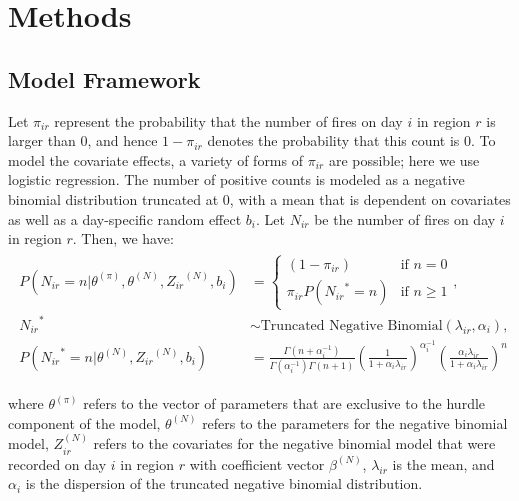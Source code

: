 \documentclass[10pt,letterpaper]{article}
\begin{document}
\hypertarget{methods}{%
\section{Methods}\label{methods}}

\hypertarget{model-framework}{%
\subsection{Model Framework}\label{model-framework}}

Let \(\pi_{ir}\) represent the probability that the number of fires on
day \(i\) in region \(r\) is larger than 0, and hence \(1-\pi_{ir}\)
denotes the probability that this count is 0. To model the covariate effects, a
variety of forms of \(\pi_{ir}\) are possible; here we use logistic
regression. The number of positive counts is modeled as a negative
binomial distribution truncated at 0, with a mean that is dependent on
covariates as well as a day-specific random effect \(b_i\). Let \(N_{ir}\) be the
number of fires on day \(i\) in region \(r\). Then, we have:
\begin{align}
\begin{split}
P(N_{ir} = n|\theta^{(\pi)}, \theta^{(N)}, {Z_{ir}}^{(N)}, b_i) &= \begin{cases}
(1-\pi_{ir}) &\text{if }n=0\\
\pi_{ir}P({N_{ir}}^* = n) &\text{if }n \ge 1
\end{cases},\\
{N_{ir}}^* &\sim \text{Truncated Negative Binomial}(\lambda_{ir}, \alpha_i),\\
P({N_{ir}}^* = n|\theta^{(N)}, {Z_{ir}}^{(N)}, b_i) &= \frac{\Gamma(n + \alpha_i^{-1})}{\Gamma(\alpha_i^{-1})\Gamma(n + 1)}{\left(\frac{1}{1 + \alpha_i\lambda_{ir}}\right)}^{\alpha_i^{-1}}{\left(\frac{\alpha_i\lambda_{ir}}{1 + \alpha_i\lambda_{ir}}\right)}^{n}
\end{split}
\label{Nir}
\end{align}

\noindent where \(\theta^{(\pi)}\) refers to the vector of parameters that are
exclusive to the hurdle component of the model, \(\theta^{(N)}\) refers
to the parameters for the negative binomial model, \(Z_{ir}^{(N)}\)
refers to the covariates for the negative binomial model that were
recorded on day \(i\) in region \(r\) with coefficient vector
\(\beta^{(N)}\), \(\lambda_{ir}\) is the mean, and \(\alpha_i\) is the
dispersion of the truncated negative binomial distribution.
\end{document}
